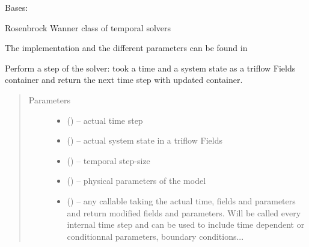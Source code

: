 \documentclass[letterpaper,10pt,english]{sphinxmanual}
\begin{document}
\begin{fulllineitems}
\label{\detokenize{triflow.plugins:triflow.plugins.schemes.ROW_general}}
Bases: 

Rosenbrock Wanner class of temporal solvers

The implementation and the different parameters can be found in

\begin{fulllineitems}
\label{\detokenize{triflow.plugins:triflow.plugins.schemes.ROW_general.__call__}}
Perform a step of the solver: took a time and a system state as a
triflow Fields container and return the next time step with updated
container.
\begin{quote}\begin{description}
\item[{Parameters}] \leavevmode\begin{itemize}
\item {} 
 () -- actual time step

\item {} 
 () -- actual system state in a triflow Fields

\item {} 
 () -- temporal step-size

\item {} 
 () -- physical parameters of the model

\item {} 
 (\sphinxstyleliteralemphasis{, }) -- any callable taking the actual time, fields and parameters and return modified fields and parameters. Will be called every internal time step and can be used to include time dependent or conditionnal parameters, boundary conditions...


\end{itemize}
\end{description}
\end{quote}
\end{fulllineitems}
\end{fulllineitems}
\end{document}
